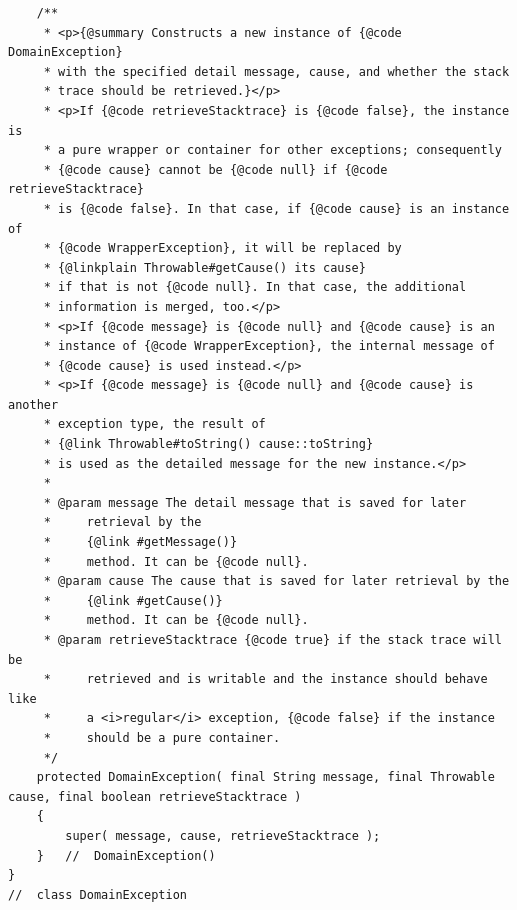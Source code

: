 \begin{lstlisting}
    /**
     * <p>{@summary Constructs a new instance of {@code DomainException}
     * with the specified detail message, cause, and whether the stack
     * trace should be retrieved.}</p>
     * <p>If {@code retrieveStacktrace} is {@code false}, the instance is
     * a pure wrapper or container for other exceptions; consequently
     * {@code cause} cannot be {@code null} if {@code retrieveStacktrace}
     * is {@code false}. In that case, if {@code cause} is an instance of
     * {@code WrapperException}, it will be replaced by
     * {@linkplain Throwable#getCause() its cause}
     * if that is not {@code null}. In that case, the additional
     * information is merged, too.</p>
     * <p>If {@code message} is {@code null} and {@code cause} is an
     * instance of {@code WrapperException}, the internal message of
     * {@code cause} is used instead.</p>
     * <p>If {@code message} is {@code null} and {@code cause} is another
     * exception type, the result of
     * {@link Throwable#toString() cause::toString}
     * is used as the detailed message for the new instance.</p>
     *
     * @param message The detail message that is saved for later
     *     retrieval by the
     *     {@link #getMessage()}
     *     method. It can be {@code null}.
     * @param cause The cause that is saved for later retrieval by the
     *     {@link #getCause()}
     *     method. It can be {@code null}.
     * @param retrieveStacktrace {@code true} if the stack trace will be
     *     retrieved and is writable and the instance should behave like
     *     a <i>regular</i> exception, {@code false} if the instance
     *     should be a pure container.
     */
    protected DomainException( final String message, final Throwable cause, final boolean retrieveStacktrace )
    {
        super( message, cause, retrieveStacktrace );
    }   //  DomainException()
}
//  class DomainException
\end{lstlisting}

